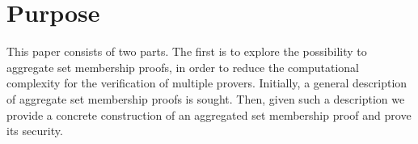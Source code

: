 






\section*{Purpose}
This paper consists of two parts. The first is to explore the possibility to aggregate set membership proofs, in order to reduce the computational complexity for the verification of multiple provers. Initially, a general description of aggregate set membership proofs is sought. Then, given such a description we provide a concrete construction of an aggregated set membership proof and prove its security.

